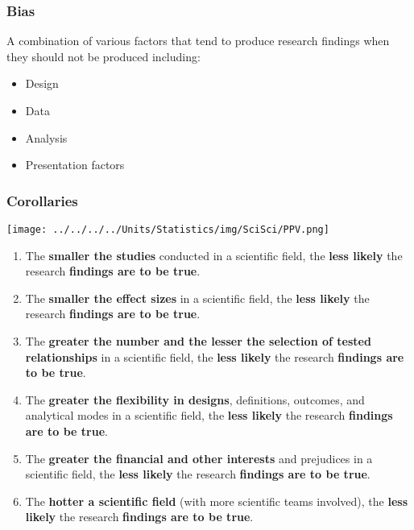 \documentclass[10pt,article]{article}
\begin{document}
\subsubsection{Bias}
\label{sec:orgf3d42d6}
A combination of various factors that tend to produce research findings when they should not be produced including:
\begin{itemize}
\item Design
\item Data
\item Analysis
\item Presentation factors
\end{itemize}
\subsubsection{Corollaries}
\label{sec:orgcae7502}
\begin{center}
\texttt{[image: ../../../../Units/Statistics/img/SciSci/PPV.png]}
\end{center}
\begin{enumerate}
\item The \textbf{smaller the studies} conducted in a scientific field, the \textbf{less likely} the research \textbf{findings are to be true}.
\item The \textbf{smaller the effect sizes} in a scientific field, the \textbf{less likely} the research \textbf{findings are to be true}.
\item The \textbf{greater the number and the lesser the selection of tested relationships} in a scientific field, the \textbf{less likely} the research \textbf{findings are to be true}.
\item The \textbf{greater the flexibility in designs}, definitions, outcomes, and analytical modes in a scientific field, the \textbf{less likely} the research \textbf{findings are to be true}.
\item The \textbf{greater the financial and other interests} and prejudices in a scientific field, the \textbf{less likely} the research \textbf{findings are to be true}.
\item The \textbf{hotter a scientific field} (with more scientific teams involved), the \textbf{less likely} the research \textbf{findings are to be true}.
\end{enumerate}
\end{document}
